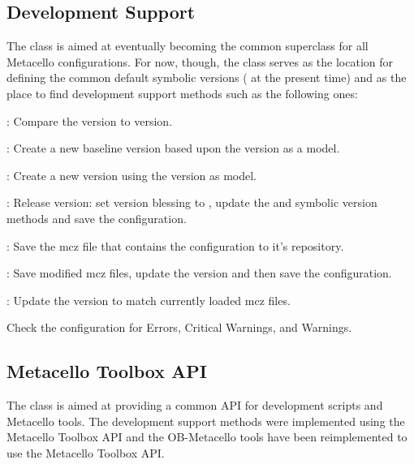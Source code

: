 \documentclass[a4paper,10pt,twoside]{book}
\begin{document}
\subsection{Development Support}

The  class is aimed at eventually becoming the common superclass for all Metacello configurations. For now, though, the class serves as the location for defining the common default symbolic versions ( at the present time) and as the place to find development support methods such as the following ones:

\begin{description}
\item {}: Compare the  version to  version.
\item {}: Create a new baseline version based upon the  version as a model.
\item {}: Create a new  version using the  version as model.
\item {}: Release  version: set version blessing to , update the  and  symbolic version methods and save the configuration.

\item {}: Save the mcz file that contains the configuration to it's repository.

\item {}: Save modified mcz files, update the  version and then save the configuration.

\item {}: Update the  version to match currently loaded mcz files.

\item {} Check the configuration for Errors, Critical Warnings, and Warnings.
\end{description}

\subsection{Metacello Toolbox API}

The  class is aimed at providing a common API for development scripts and Metacello tools. The development support methods were implemented using the Metacello Toolbox API and the OB-Metacello tools have been reimplemented to use the Metacello Toolbox API.
\end{document}
